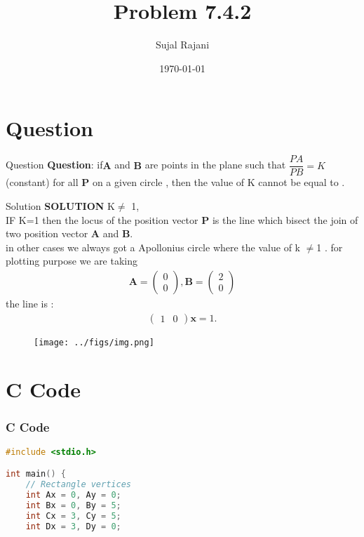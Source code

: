 \documentclass{beamer}
\title{Problem 7.4.2}
\author{Sujal Rajani}
\date{\today}
\let\vec\mathbf
\theoremstyle{remark}
\newcommand{\myvec}[1]{\ensuremath{\begin{pmatrix}#1\end{pmatrix}}}
\numberwithin{equation}{section}
\begin{document}
\begin{frame}
\titlepage
\end{frame}

\section{Question}
\begin{frame}{Question}
\textbf{Question}:
if$\vec{A}$ and $\vec{B}$ are points in the plane such that $\dfrac{PA}{PB}=K$(constant) for all $\vec{P}$ on a given circle , then the value of K cannot be equal to .
\end{frame}
\begin{frame}{Solution}
\textbf{SOLUTION}
 K$\neq$ 1,
 \\
 IF K=1 then the locus of the position vector $\vec{P}$ is the line which bisect the join of two position vector $\vec{A}$ and $\vec{B} $.
 \\
 in other cases we always got a Apollonius circle where the value of k $\neq $1 . 
 for plotting purpose we are taking 
 \begin{align*}
     \vec{A}=\myvec{0\\0}, \vec{B}=\myvec{2\\0}
 \end{align*}
  the line is :
 \begin{align*}
     \myvec{1&0}\vec{x}=1.
 \end{align*}
     \end{frame}
       \begin{frame}[fragile]
    \begin{figure}[H]
    \centering
    \texttt{[image: ../figs/img.png]}
    \caption*{}
    \label{figs}
\end{figure}
\end{frame}
\section{ C Code}
\begin{frame}[fragile]
\frametitle{C Code }
\begin{lstlisting}[language=C]
#include <stdio.h>

int main() {
    // Rectangle vertices
    int Ax = 0, Ay = 0;
    int Bx = 0, By = 5;
    int Cx = 3, Cy = 5;
    int Dx = 3, Dy = 0;

 

\end{lstlisting}
\end{frame}
\end{document}
